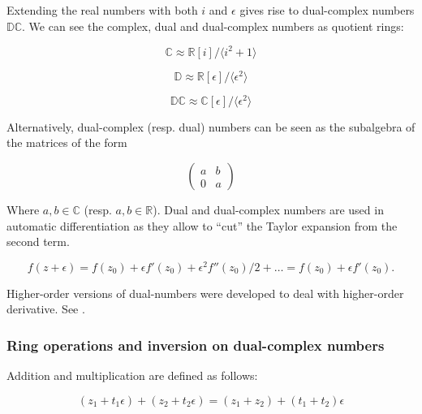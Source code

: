 \documentclass{article}
\newcommand{\R}{\mathbb{R}}
\newcommand{\C}{\mathbb{C}}
\newcommand{\D}{\mathbb{D}}
\newcommand{\DC}{\mathbb{DC}}
\newcommand{\e}{\epsilon}
\begin{document}
Extending the real numbers with both $i$ and $\e$ gives rise to dual-complex numbers $\DC$. We can see the complex, dual and dual-complex numbers as quotient rings:

\begin{multicols}{3}

\noindent
\begin{equation}
\C \approx \R [i]/\langle i^2+1 \rangle
\end{equation}

\columnbreak

\noindent
\begin{equation}
\D \approx \R [\e]/\langle \e^2 \rangle
\end{equation}

\columnbreak

\noindent
\begin{equation}
\DC \approx \C [\e]/\langle \e^2 \rangle
\end{equation}
\end{multicols}

Alternatively, dual-complex (resp. dual) numbers can be seen as the subalgebra of the matrices of the form

\begin{equation}
\begin{pmatrix}
 a & b\\
 0 & a
\end{pmatrix}
\end{equation}

Where $a, b \in \C$ (resp. $a, b \in \R$). Dual and dual-complex numbers are used in automatic differentiation as they allow to ``cut'' the Taylor expansion from the second term. \cite{baydin2018, rev2016}

\begin{equation}
f(z + \e) = f(z_0) + \e f'(z_0) + \e^2 f''(z_0)/2 + \dots = f(z_0) + \e f'(z_0).
\end{equation}

Higher-order versions of dual-numbers were developed to deal with higher-order derivative. See \cite{szi2021, behr2019}.

\subsubsection*{Ring operations and inversion on dual-complex numbers}

Addition and multiplication are defined as follows:

\begin{equation}
(z_1 + t_1 \e) + (z_2 + t_2 \e) = (z_1 + z_2) + (t_1 + t_2) \e
\end{equation}
\end{document}

